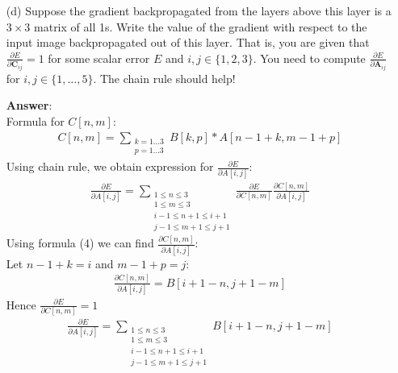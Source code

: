 \documentclass[12pt,letterpaper]{article}
\newcommand{\matr}[1]{\bm{#1}}     %
\begin{document}
\begin{itemize}
    \item[(d)] Suppose the gradient backpropagated from the layers above this layer is a $3\times 3$ matrix of all 1s. Write the value of the gradient with respect to the input image backpropagated out of this layer.
    That is, you are given that $\frac{\partial E}{\partial \matr{C}_{ij}} = 1$ for some scalar error $E$ and $i,j\in\{1,2,3\}$. You need to compute $\frac{\partial E}{\partial \matr{A}_{ij}}$ for  $i,j\in\{1, \ldots, 5\}$. The chain rule should help!
    
    \textbf{Answer}: \\
        Formula for $C[n,m]$:
        \begin{align}
            C[n,m]=\sum\limits_{\substack{k=1...3 \\ p=1...3}}B[k, p]*A[n-1+k, m-1+p]
        \end{align}
        Using chain rule, we obtain expression for $\frac{\partial E}{\partial A[i,j]}$:
        \begin{align}
            \frac{\partial E}{\partial A[i,j]} =
            \sum\limits_{\substack{1\leq n \leq 3 \\ 1\leq m \leq 3 
            \\ i-1\leq n+1 \leq i+1 \\ j-1\leq m+1 \leq j+1}}
            \frac{\partial E}{\partial C[n,m]}\frac{\partial C[n,m]}{\partial A[i,j]}
        \end{align}
        Using formula (4) we can find $\frac{\partial C[n,m]}{\partial A[i,j]}$: \\
        Let $n-1+k=i$ and $m-1+p=j$:
        \begin{align}
            \frac{\partial C[n,m]}{\partial A[i,j]}=B[i+1-n,j+1-m]
        \end{align}
        Hence $\frac{\partial E}{\partial C[n,m]} = 1$  
        \begin{align}
            \frac{\partial E}{\partial A[i,j]} =
            \sum\limits_{\substack{1\leq n \leq 3 \\ 1\leq m \leq 3 
            \\ i-1\leq n+1 \leq i+1 \\ j-1\leq m+1 \leq j+1}}
            B[i+1-n,j+1-m]
        \end{align}
     
     
\end{itemize}
 
\end{document}
